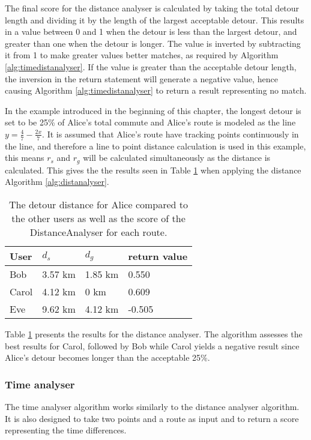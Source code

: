 The final score for the distance analyser is calculated by taking the total detour length and dividing it by the length of the largest acceptable detour.
This results in a value between 0 and 1 when the detour is less than the largest detour, and greater than one when the detour is longer.
The value is inverted by subtracting it from 1 to make greater values better matches, as required by Algorithm \ref{alg:timedistanalyser}.
If the value is greater than the acceptable detour length, the inversion in the return statement will generate a negative value, hence causing Algorithm \ref{alg:timedistanalyser} to return a result representing no match.

In the example introduced in the beginning of this chapter, the longest detour is set to be 25\% of Alice's total commute and Alice's route is modeled as the line  $y = \frac{4}{7}-\frac{2 x}{7}$.
It is assumed that Alice's route have tracking points continuously in the line, and therefore a line to point distance calculation is used in this example, this means $r_s$ and $r_g$ will be calculated simultaneously as the distance is calculated.
This gives the the results seen in Table \ref{tbl:distance} when applying the distance  Algorithm \ref{alg:distanalyser}.

\begin{table}[!ht]
\centering
\begin{tabular}{@{}llll@{}}
\toprule
\textbf{User} 	& \textbf{$d_s$} & \textbf{$d_g$} 	& \textbf{return value} 	\\ \midrule
Bob         	& 3.57 km        & 1.85 km	    	& 0.550		 			\\
Carol         	& 4.12 km        & 0 km       		& 0.609        		\\
Eve           	& 9.62 km        & 4.12 km		    & -0.505        		\\ \bottomrule
\end{tabular}
\caption{The detour distance for Alice compared to the other users as well as the score of the DistanceAnalyser for each route.}
\label{tbl:distance}
\end{table}

Table \ref{tbl:distance} presents the results for the distance analyser.
The algorithm assesses the best results for Carol, followed by Bob while Carol yields a negative result since Alice's detour becomes longer than the acceptable 25\%. 


\subsubsection{Time analyser}
The time analyser algorithm works similarly to the distance analyser algorithm. 
It is also designed to take two points and a route as input and to return a score representing the time differences.

